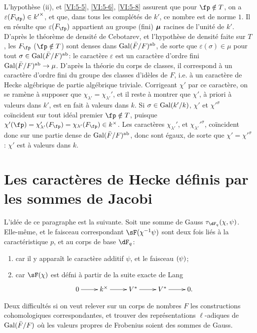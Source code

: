 L'hypothèse (ii), et \ref{VI:5-5}, \ref{VI:5-6}, \ref{VI:5-8} assurent que 
pour $\fp\notin T$, on a $\varepsilon(F_\fp)\in {k'}^\times$, et que, dans tous 
les complétés de $k'$, ce nombre est de norme $1$. Il en résulte que 
$\varepsilon(F_\fp)$ appartient au groupe (fini) ${\bm\mu}$ racines de l'unité 
de $k'$. D'après le théorème de densité de Cebotarev, et l'hypothèse 
de densité faite sur $T$, les $F_\fp$ ($\fp\notin T$) sont denses dans 
$\operatorname{Gal}(\bar F/F)^\text{ab}$, de sorte que $\varepsilon(\sigma)\in \mu$ pour tout 
$\sigma\in \operatorname{Gal}(\bar F/F)^\text{ab}$: le caractère $\varepsilon$ est un 
caractère d'ordre fini $\operatorname{Gal}(\bar F/F)^\text{ab}\to \mu$. D'après la 
théorie du corps de classes, il correspond à un caractère d'ordre fini 
du groupe des classes d'idèles de $F$, i.e. à un caractère de Hecke 
algébrique de partie algébrique triviale. Corrigeant $\chi'$ par ce 
caractère, on se ramène à supposer que 
$\chi_{\lambda'}=\chi_{\lambda'}'$,  et il reste à montrer que $\chi'$, à 
priori à valeurs dans $k'$, est en fait à valeurs dans $k$. Si 
$\sigma\in \operatorname{Gal}(k'/k)$, $\chi'$ et ${\chi'}^\sigma$ coïncident sur tout idéal 
premier $\fp\notin T$, puisque 
$\chi'(\fp) = \chi'_{\lambda'}(F_\fp) = \chi_{\lambda'}(F_\fp) \in k^\times$. 
Les caractères $\chi_{\lambda'}'$, et ${\chi_{\lambda'}'}^\sigma$, coïncident 
donc sur une partie dense de $\operatorname{Gal}(\bar F/F)^\text{ab}$, donc sont égaux, de 
sorte que $\chi'={\chi'}^\sigma$: $\chi'$ est à valeurs dans $k$. 










\section{Les caractères de Hecke définis par les sommes de Jacobi}\label{VI:6}

L'idée de ce paragraphe est la suivante. Soit une somme de Gauss 
$\tau_{\dF_q}(\chi,\psi)$. Elle-même, et le faisceau correspondant 
$\sF(\chi^{-1}\psi)$ sont deux fois liés à la caractéristique $p$, et au 
corps de base $\dF_q$: 
\begin{enumerate}[\indent a)]
  \item car il y appara\^it le caractère additif $\psi$, et le faisceau 
    $\sf(\psi)$; 
  \item car $\sF(\chi)$ est défni à partir de la suite exacte de Lang 
    \[\xymatrix{
      0 \ar[r] 
        & k^\times \ar[r] 
        & V^\ast \ar[r] 
        & V^\ast \ar[r] 
        & 0 \text{.} 
    }\]
\end{enumerate}
Deux difficultés si on veut relever sur un corps de nombres $F$ les 
constructions cohomologiques correspondantes, et trouver des 
représentations $\ell$-adiques de $\operatorname{Gal}(\bar F/F)$ où les valeurs propres 
de Frobenius soient des sommes de Gauss. 

